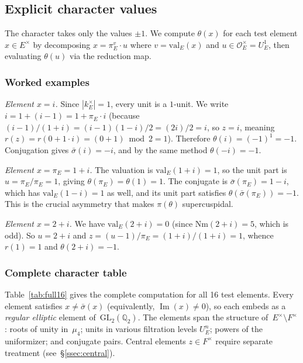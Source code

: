 \documentclass[11pt]{article}
\theoremstyle{plain}
\theoremstyle{definition}
\theoremstyle{remark}
\newcommand{\Q}{\mathbb{Q}}
\newcommand{\calO}{\mathcal{O}}
\newcommand{\GL}{\mathrm{GL}}
\newcommand{\Nm}{\mathrm{Nm}}
\newcommand{\val}{\mathrm{val}}
\begin{document}
\subsection{Explicit character values}

The character takes only the values $\pm 1$.  We compute
$\theta(x)$ for each test element $x \in E^\times$ by
decomposing $x = \pi_E^v \cdot u$ where $v = \val_E(x)$ and
$u \in \calO_E^\times = U_E^1$, then evaluating $\theta(u)$
via the reduction map.

\subsubsection*{Worked examples}

\noindent
\emph{Element $x = i$.}
Since $|k_E^\times| = 1$, every unit is a $1$-unit.  We write
$i = 1 + (i - 1) = 1 + \pi_E \cdot i$ (because
$(i-1)/(1+i) = (i-1)(1-i)/2 = (2i)/2 = i$, so $z = i$,
meaning $r(z) = r(0 + 1 \cdot i) = (0+1) \bmod 2 = 1$).
Therefore $\theta(i) = (-1)^1 = -1$.  Conjugation gives
$\bar\sigma(i) = -i$, and by the same method $\theta(-i) = -1$.

\noindent
\emph{Element $x = \pi_E = 1+i$.}
The valuation is $\val_E(1+i) = 1$, so the unit part is
$u = \pi_E / \pi_E = 1$, giving $\theta(\pi_E) = \theta(1) = 1$.
The conjugate is $\bar\sigma(\pi_E) = 1-i$, which has
$\val_E(1-i) = 1$ as well, and its unit part satisfies
$\theta(\bar\sigma(\pi_E)) = -1$.  This is the crucial asymmetry
that makes $\pi(\theta)$ supercuspidal.

\noindent
\emph{Element $x = 2+i$.}
We have $\val_E(2+i) = 0$ (since $\Nm(2+i) = 5$, which is odd).
So $u = 2+i$ and $z = (u-1)/\pi_E = (1+i)/(1+i) = 1$, whence
$r(1) = 1$ and $\theta(2+i) = -1$.

\subsubsection*{Complete character table}

Table~\ref{tab:full16} gives the complete computation for all
16 test elements.  Every element satisfies
$x \neq \bar\sigma(x)$ (equivalently, $\operatorname{Im}(x)
\neq 0$), so each embeds as a \emph{regular elliptic} element
of~$\GL_2(\Q_2)$.  The elements span the structure
of~$E^\times \setminus F^\times$: roots of unity in~$\mu_4$;
units in various filtration levels $U_E^n$; powers of the
uniformizer; and conjugate pairs.  Central elements
$z \in F^\times$ require separate treatment
(see~\S\ref{ssec:central}).
\end{document}
